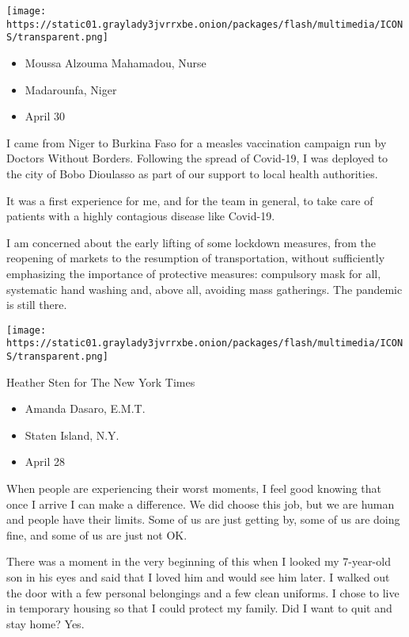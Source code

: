\texttt{[image: https://static01.graylady3jvrrxbe.onion/packages/flash/multimedia/ICONS/transparent.png]}

\begin{itemize}
\tightlist
\item
  Moussa Alzouma Mahamadou, Nurse
\item
  Madarounfa, Niger
\item
  April 30
\end{itemize}

I came from Niger to Burkina Faso for a measles vaccination campaign run
by Doctors Without Borders. Following the spread of Covid-19, I was
deployed to the city of Bobo Dioulasso as part of our support to local
health authorities.

It was a first experience for me, and for the team in general, to take
care of patients with a highly contagious disease like Covid-19.

I am concerned about the early lifting of some lockdown measures, from
the reopening of markets to the resumption of transportation, without
sufficiently emphasizing the importance of protective measures:
compulsory mask for all, systematic hand washing and, above all,
avoiding mass gatherings. The pandemic is still there.

\texttt{[image: https://static01.graylady3jvrrxbe.onion/packages/flash/multimedia/ICONS/transparent.png]}

Heather Sten for The New York Times

\begin{itemize}
\tightlist
\item
  Amanda Dasaro, E.M.T.
\item
  Staten Island, N.Y.
\item
  April 28
\end{itemize}

When people are experiencing their worst moments, I feel good knowing
that once I arrive I can make a difference. We did choose this job, but
we are human and people have their limits. Some of us are just getting
by, some of us are doing fine, and some of us are just not OK.

There was a moment in the very beginning of this when I looked my
7-year-old son in his eyes and said that I loved him and would see him
later. I walked out the door with a few personal belongings and a few
clean uniforms. I chose to live in temporary housing so that I could
protect my family. Did I want to quit and stay home? Yes.

